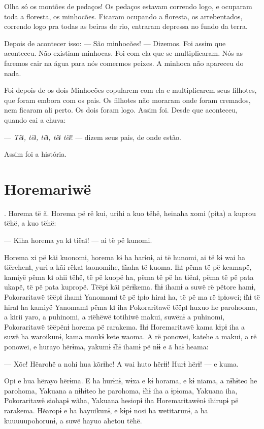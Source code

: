 Olha só os montões de pedaços! Os pedaços estavam correndo logo, e
ocuparam toda a floresta, os minhocões. Ficaram ocupando a floresta, os
arrebentados, correndo logo pra todas as beiras de rio, entraram depressa
no fundo da terra. 

Depois de acontecer isso: --- São minhocões! --- Dizemos. Foi assim que aconteceu.
Não existiam minhocas. Foi com ela que se multiplicaram. Nós as faremos
cair na água para nós comermos peixes. A minhoca não apareceu do nada. 

Foi depois de os dois Minhocões copularem com ela e multiplicarem seus
filhotes, que foram embora com os pais. Os filhotes não moraram onde
foram cremados, nem ficaram ali perto. Os dois foram logo. Assim foi. Desde
que aconteceu, quando cai a chuva:

--- \textit{Tëɨ, tëɨ, tëɨ, tëɨ tëɨ}! --- dizem seus pais, de onde estão. 

Assim foi a história.

\chapter{Horemariwë}

. Horema të ã. Horema pë rë kui, urihi a kuo tëhë, heinaha xomi
(pita) a kuprou tëhë, a kuo tëhë:

--- Kiha horema ya kɨ tiëaɨ! --- ai të pë kunomi. 

Horema xi pë kãi kuonomi, horema kɨ ha harɨnɨ, ai të hunomi, ai të kɨ
wai ha tiërehenɨ, yuri a kãi rëkaɨ taonomihe, ɨ̃naha të kuoma. Ɨhɨ pëma
të pë keamapë, kamiyë pëma kɨ ohii tëhë, të pë kuopë ha, pëma të pë ha
tiënɨ, pëma të pë pata ukapë, të pë pata kupropë. Tëëpɨ kãi përɨkema.
Ɨhɨ ihamɨ a suwë rë pëtore hamɨ, Pokoraritawë tëëpɨ ihamɨ Yanomamɨ të pë
ɨpɨo hiraɨ ha, të pë ma rë ɨpɨowei; ɨ̃hɨ të hiraɨ ha kamiyë Yanomamɨ pëma
kɨ iha Pokoraritawë tëëpɨ huxuo he parohooma, a kirii yaro, a puhinomi,
a riëhëwë totihiwë makui, suwënɨ a puhinomi, Pokoraritawë tëëpënɨ horema
pë rarakema. Ɨhɨ Horemaritawë kama kɨpɨ iha a suwë ha waroikunɨ, kama
moukɨ kete waoma. A rë ponowei, katehe a makui, a rë ponowei, e hurayo
hërɨma, yakumɨ ɨ̃hɨ ihamɨ pë nɨɨ e ã haɨ heama: 

--- Xõe! Hẽarohë a nohi hua kõrɨhe! A wai huto hërɨɨ! Hurɨ hërɨ! --- e
kuma. 

Opi e hua hërayo hërɨma. E ha hurɨnɨ, wɨxa e kɨ horama, e kɨ niama, a
nɨhɨteo he parohoma, Yakuana a nɨhɨteo he parohoma, ɨ̃hɨ iha a ɨpɨoma,
Yakuana iha, Pokoraritawë siohapɨ wãha, Yakuana hesiopɨ iha
Horemaritawënɨ ihirupɨ pë rarakema. Hẽaropɨ e ha hayuikunɨ, e kɨpɨ nosi
ha wetitarunɨ, a ha kuuuuupohorunɨ, a suwë hayuo ahetou tëhë. 

